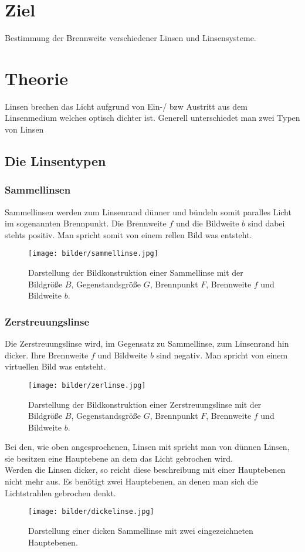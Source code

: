 \section{Ziel}
Bestimmung der Brennweite verschiedener Linsen und Linsensysteme.
\section{Theorie}
Linsen brechen das Licht aufgrund von Ein-/ bzw Austritt aus dem Linsenmedium welches optisch dichter ist.
Generell unterschiedet man zwei Typen von Linsen
\subsection{Die Linsentypen}
\subsubsection*{Sammellinsen}
Sammellinsen werden zum Linsenrand dünner und bündeln somit paralles Licht im sogenannten Brennpunkt.
Die Brennweite $f$ und die Bildweite $b$ sind dabei stehts positiv.
Man spricht somit von einem rellen Bild was entsteht.
\begin{figure}[H]
    \centering
    \texttt{[image: bilder/sammellinse.jpg]}
    \caption{Darstellung der Bildkonstruktion einer Sammellinse mit der Bildgröße $B$,
    Gegenstandsgröße $G$, Brennpunkt $F$, Brennweite $f$ und Bildweite $b$.\cite[1]{anleitung}}
\end{figure}

\subsubsection*{Zerstreuungslinse}
Die Zerstreuungslinse wird, im Gegensatz zu Sammellinse, zum Linsenrand hin dicker.
Ihre Brennweite $f$ und Bildweite $b$ sind negativ. Man spricht von einem virtuellen Bild was entsteht.
\begin{figure}[H]
    \centering
    \texttt{[image: bilder/zerlinse.jpg]}
    \caption{Darstellung der Bildkonstruktion einer Zerstreuungslinse mit der Bildgröße $B$,
    Gegenstandsgröße $G$, Brennpunkt $F$, Brennweite $f$ und Bildweite $b$.\cite[1]{anleitung}}
\end{figure}

Bei den, wie oben angesprochenen, Linsen mit spricht man von dünnen Linsen, sie besitzen eine
Hauptebene an dem das Licht gebrochen wird.\\
Werden die Linsen dicker, so reicht diese beschreibung mit einer Hauptebenen nicht mehr aus. Es benötigt zwei Hauptebenen, an 
denen man sich die Lichtstrahlen gebrochen denkt.
\begin{figure}
    \centering
    \texttt{[image: bilder/dickelinse.jpg]}
    \caption{Darstellung einer dicken Sammellinse mit zwei eingezeichneten Hauptebenen.\cite[1]{anleitung}}
\end{figure}
